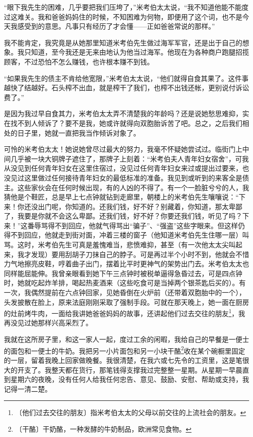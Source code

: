 \documentclass[12pt,UTF-8,openany]{ctexbook}
\begin{document}
\begin{normalsize}
    “眼下我先生的困难，几乎要把我们压垮了，”米考伯太太说，“我不知道他能不能度过这难关。我和爸爸妈妈住的时候，不知困难为何物，即便用了这个词，也不是今天我感受到的意思。凡事只有经历了才会懂——正如爸爸常说的那样。”
    
    我不能肯定，我究竟是从她那里知道米考伯先生做过海军军官，还是出于自己的想象。我只知道，至今我还是无来由地认为他当过海军。他现在为各种商户跑腿招揽顾客，不过恐怕不怎么赚钱，也许根本赚不到钱。
    
    “如果我先生的债主不肯给他宽限，”米考伯太太说，“他们就得自食其果了。这件事越快了结越好。石头榨不出血，就是榨干了我们，也榨不出钱还帐，更别说付诉讼费了。”
    
    是因为我过早自食其力，米考伯太太弄不清楚我的年龄吗？还是说她愁思难抑，实在找不到人倾诉了？要不是我，她或许就得向双胞胎诉苦了吧。总之，之后我们相处的日子里，她就一直把我当作倾诉对象了。
    
    可怜的米考伯太太！她说她曾尽过最大的努力，我毫不怀疑她尝试过。临街门上中间几乎被一块大铜牌子遮住了，那牌子上刻着：“米考伯夫人青年妇女宿舍”，可我从没见到任何青年妇女在这里住宿过，没见过任何青年妇女来过或提出过要来，也没见过这里做过任何接待青年妇女的最低标准的准备。我见到或听到的来客全是债主。这些家伙会在任何时候出现，有的人凶的不得了。有一个一脸脏兮兮的人，我猜他是个鞋匠，总是早上七点钟就钻到走廊里，朝楼上的米考伯先生嚷嚷说：“下来！你还没出门呢，你知道的。还我们钱，好不好？别藏着，你知道，那太卑鄙了，我要是你就不会这么卑鄙。还我们钱，好不好？你要还我们钱，听见了吗？下来！”这番辱骂得不到回应，他就气得骂出“骗子”、“强盗”这些字眼来。但这样仍得不到回应，他就走到街对面，冲着三楼的窗子（他知道米考伯先生住哪一层）叫骂。这时，米考伯先生可真是羞愧难当，悲愤难抑，甚至（有一次他太太尖叫起来，我才发现）要用刮胡子刀抹自己的脖子。可是再过半个小时不到，他就会不惜力气地擦亮皮鞋，哼着曲子出门，摆着比平时更神气的架势出门去。米考伯太太也同样能屈能伸。我曾亲眼看到她下午三点钟时被税单逼得急昏过去，可是四点钟时，她就吃起炸羊排，喝起热麦酒来（这些吃食可是当掉两个银茶匙后买的）。有一次，我偶然提前在六点钟回家，见她昏倒在火炉前（还带着双胞胎中的一个），头发披散在脸上，原来法庭刚刚采取了强制手段。可就在那天晚上，她一面在厨房的灶前烤牛肉，一面给我讲她爸爸妈妈的故事，还讲起他们过去交往的朋友\footnote{〔他们过去交往的朋友〕指米考伯太太的父母以前交往的上流社会的朋友。}，我再没见过她那样兴高采烈了。
    
    我就在这所房子里，和这一家人一起，度过工余的闲暇，我给自己的早餐是一便士的面包和一便士的牛奶。我把另一小片面包和另一小块干酪\footnote{〔干酪〕干奶酪，一种发酵的牛奶制品，欧洲常见食物。}收在某个碗橱里固定的一层，留着我晚上回家做晚餐。我很清楚，在我六或七先令的工资里，这是笔很大的开支了。我整天都在货行，那笔钱得支撑我过完整整一星期。从星期一早晨直到星期六的夜晚，没有任何人给我任何忠告、意见、鼓励、安慰、帮助或支持，我记得一清二楚。
    

\end{normalsize}
\end{document}
